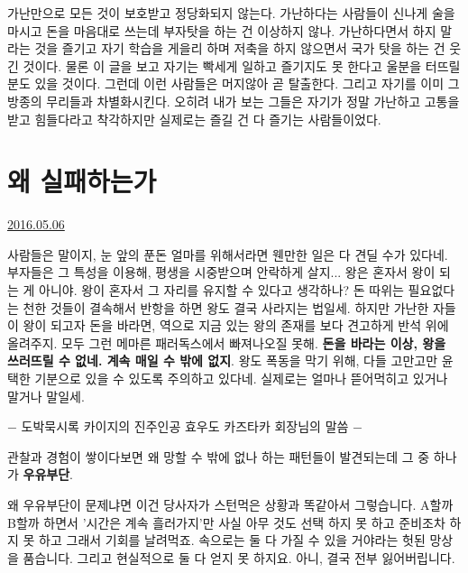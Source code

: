 가난만으로 모든 것이 보호받고 정당화되지 않는다.
가난하다는 사람들이 신나게 술을 마시고 돈을 마음대로 쓰는데 부자탓을 하는 건 이상하지 않나.
가난하다면서 하지 말라는 것을 즐기고 자기 학습을 게을리 하며 저축을 하지 않으면서 국가 탓을 하는 건 웃긴 것이다.
물론 이 글을 보고 자기는 빡세게 일하고 즐기지도 못 한다고 울분을 터뜨릴 분도 있을 것이다.
그런데 이런 사람들은 머지않아 곧 탈출한다. 그리고 자기를 이미 그 방종의 무리들과 차별화시킨다.
오히려 내가 보는 그들은 자기가 정말 가난하고 고통을 받고 힘들다라고 착각하지만 실제로는 즐길 건 다 즐기는 사람들이었다.
\vspace{5mm}





\section{왜 실패하는가}
\href{https://www.kockoc.com/Apoc/762686}{2016.05.06}

\vspace{5mm}

사람들은 말이지, 눈 앞의 푼돈 얼마를 위해서라면 웬만한 일은 다 견딜 수가 있다네.
부자들은 그 특성을 이용해, 평생을 시중받으며 안락하게 살지...
왕은 혼자서 왕이 되는 게 아니야. 왕이 혼자서 그 자리를 유지할 수 있다고 생각하나?
돈 따위는 필요없다는 천한 것들이 결속해서 반항을 하면 왕도 결국 사라지는 법일세.
하지만 가난한 자들이 왕이 되고자 돈을 바라면, 역으로 지금 있는 왕의 존재를 보다 견고하게 반석 위에 올려주지.
모두 그런 메마른 패러독스에서 빠져나오질 못해. \textbf{돈을 바라는 이상, 왕을 쓰러뜨릴 수 없네. 계속 매일 수 밖에 없지}.
왕도 폭동을 막기 위해, 다들 고만고만 윤택한 기분으로 있을 수 있도록 주의하고 있다네. 실제로는 얼마나 뜯어먹히고 있거나 말거나 말일세.
\vspace{5mm}

$-$ 도박묵시록 카이지의 진주인공 효우도 카즈타카 회장님의 말씀 $-$
\vspace{5mm}

관찰과 경험이 쌓이다보면 왜 망할 수 밖에 없나 하는 패턴들이 발견되는데
그 중 하나가 \textbf{우유부단}.
\vspace{5mm}

왜 우유부단이 문제냐면 이건 당사자가 스턴먹은 상황과 똑같아서 그렇습니다.
A할까 B할까 하면서 '시간은 계속 흘러가지'만 사실 아무 것도 선택 하지 못 하고 준비조차 하지 못 하고 그래서 기회를 날려먹죠.
속으로는 둘 다 가질 수 있을 거야라는 헛된 망상을 품습니다. 그리고 현실적으로 둘 다 얻지 못 하지요. 아니, 결국 전부 잃어버립니다.
\vspace{5mm}

